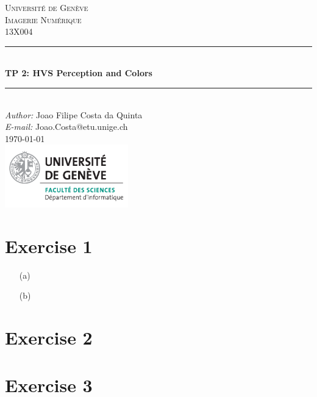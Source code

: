 \documentclass[a4paper]{article}
\makeatletter
\newcommand\TPid{2}
\newcommand\TPname{HVS Perception and Colors}
\newcommand\Firstname{Joao Filipe}
\newcommand\Familyname{Costa da Quinta}
\newcommand\Email{Joao.Costa@etu.unige.ch}
\makeatother
\begin{document}
\begin{titlepage}

\newcommand{\HRule}{\rule{\linewidth}{0.5mm}} 							%
\newcommand\tab[1][1cm]{\hspace*{#1}}
\center 
 
\textsc{\LARGE Université de Genève}\\[1cm]

\textsc{\Large Imagerie Numérique}\\[0.2cm]
\textsc{\large 13X004}\\[1cm] 										%
\HRule \\[0.8cm]
{ \huge \bfseries TP \TPid : \TPname}\\[0.7cm]								%
\HRule \\[2cm]
\large
\emph{Author:} \Firstname \; \Familyname\\[0.5cm]		
\emph{E-mail:} {\color{blue}\Email}\\[7cm]		
{\large \today}\\[2cm]
\includegraphics[width=0.4\textwidth]{images/unige_csd.png}\\[1cm] 	%
\vfill 
\end{titlepage}


\section*{Exercise 1}
\begin{itemize}
\item[(a)]
\item[(b)]
\end{itemize}

\section*{Exercise 2}

\section*{Exercise 3}
\end{document}
